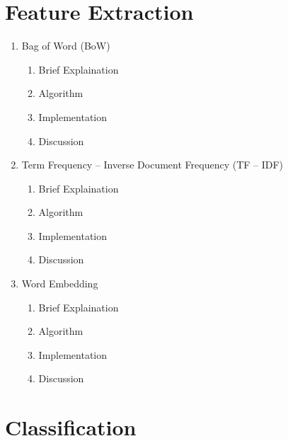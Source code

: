 \documentclass{article}
\begin{document}
\section{Feature Extraction}

\begin{enumerate}[label=3.\arabic*]
    \item Bag of Word (BoW) \\
    \begin{enumerate}[label=3.1.\arabic*]
        \item Brief Explaination
        \item Algorithm
        \item Implementation
        \item Discussion
    \end{enumerate}
    
    \item Term Frequency – Inverse Document Frequency (TF – IDF)
    \begin{enumerate}[label=3.2.\arabic*]
        \item Brief Explaination
        \item Algorithm
        \item Implementation
        \item Discussion
    \end{enumerate}
    
    \item Word Embedding
    \begin{enumerate}[label=3.3.\arabic*]
        \item Brief Explaination
        \item Algorithm
        \item Implementation
        \item Discussion
    \end{enumerate}
\end{enumerate}


\section{Classification}
\end{document}
